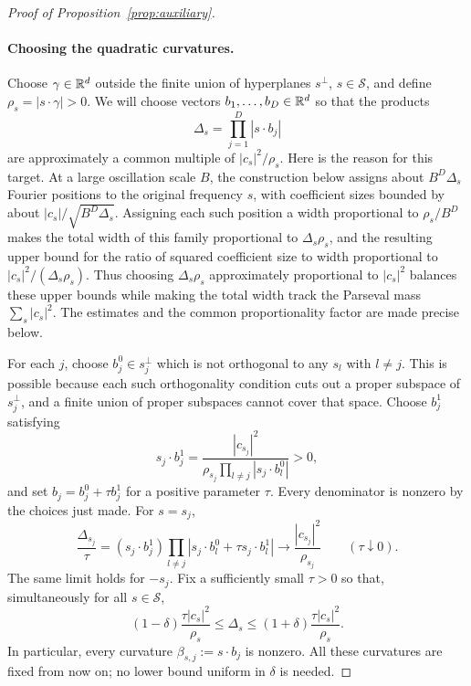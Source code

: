 \begin{proof}[Proof of Proposition~\ref{prop:auxiliary}]
\paragraph{Choosing the quadratic curvatures.}
Choose $\gamma\in\mathbb R^d$ outside the finite union of hyperplanes
$s^\perp$, $s\in\mathcal S$, and define
$\rho_s=|s\cdot\gamma|>0$.  We will choose vectors
$b_1,\ldots,b_D\in\mathbb R^d$ so that the products
\[
 \Delta_s=\prod_{j=1}^D|s\cdot b_j|
\]
are approximately a common multiple of $|c_s|^2/\rho_s$.
Here is the reason for this target. At a large oscillation scale $B$,
the construction below assigns about $B^D\Delta_s$ Fourier positions
to the original frequency $s$, with coefficient sizes bounded by about
$|c_s|/\sqrt{B^D\Delta_s}$. Assigning each such position a width
proportional to $\rho_s/B^D$ makes the total width of this family
proportional to $\Delta_s\rho_s$, and the resulting upper bound for the
ratio of squared coefficient size to width proportional to
$|c_s|^2/(\Delta_s\rho_s)$.
Thus choosing $\Delta_s\rho_s$ approximately proportional to $|c_s|^2$
balances these upper bounds while making the total width track the Parseval mass
$\sum_s|c_s|^2$. The estimates and the common proportionality factor
are made precise below.

For each $j$, choose $b_j^0\in s_j^\perp$ which is not orthogonal to
any $s_l$ with $l\ne j$.  This is possible because each such
orthogonality condition cuts out a proper subspace of $s_j^\perp$,
and a finite union of proper subspaces cannot cover that space.
Choose $b_j^1$ satisfying
\[
 s_j\cdot b_j^1
 =\frac{|c_{s_j}|^2}
 {\rho_{s_j}\prod_{l\ne j}|s_j\cdot b_l^0|}>0,
\]
and set $b_j=b_j^0+\tau b_j^1$ for a positive parameter $\tau$.
Every denominator is nonzero by the choices just made.  For $s=s_j$,
\[
 \frac{\Delta_{s_j}}\tau
 =(s_j\cdot b_j^1)
   \prod_{l\ne j}|s_j\cdot b_l^0+\tau s_j\cdot b_l^1|
 \longrightarrow\frac{|c_{s_j}|^2}{\rho_{s_j}}
 \qquad(\tau\downarrow0).
\]
The same limit holds for $-s_j$.  Fix a sufficiently small $\tau>0$
so that, simultaneously for all $s\in\mathcal S$,
\begin{equation}
 \label{eq:determinant-tuning}
 (1-\delta)\frac{\tau|c_s|^2}{\rho_s}
 \le\Delta_s\le
 (1+\delta)\frac{\tau|c_s|^2}{\rho_s}.
\end{equation}
In particular, every curvature
$\beta_{s,j}:=s\cdot b_j$ is nonzero.  All these curvatures are fixed
from now on; no lower bound uniform in $\delta$ is needed.


\end{proof}
